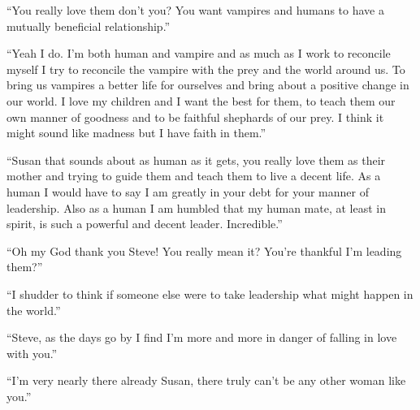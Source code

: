 ``You really love them don't you? You want vampires and humans to have a mutually beneficial relationship.''

``Yeah I do. I'm both human and vampire and as much as I work to reconcile myself I try to reconcile the vampire with the prey and the world around us. To bring us vampires a better life for ourselves and bring about a positive change in our world. I love my children and I want the best for them, to teach them our own manner of goodness and to be faithful shephards of our prey. I think it might sound like madness but I have faith in them.''

``Susan that sounds about as human as it gets, you really love them as their mother and trying to guide them and teach them to live a decent life. As a human I would have to say I am greatly in your debt for your manner of leadership. Also as a human I am humbled that my human mate, at least in spirit, is such a powerful and decent leader. Incredible.''

``Oh my God thank you Steve! You really mean it? You're thankful I'm leading them?''

``I shudder to think if someone else were to take leadership what might happen in the world.''

``Steve, as the days go by I find I'm more and more in danger of falling in love with you.''

``I'm very nearly there already Susan, there truly can't be any other woman like you.''


























